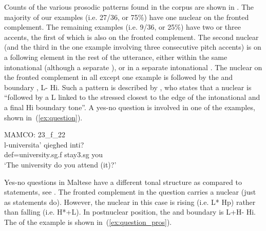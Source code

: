 \documentclass[output=paper]{LSP/langsci}
\begin{document}
Counts of the various prosodic patterns found in the corpus are shown
in . The majority of our examples
(i.e. 27/36, or 75\%) have one nuclear  on the fronted
complement. The remaining examples (i.e. 9/36, or 25\%) have two or
three  accents, the first of which is also on the fronted
complement. The second nuclear  (and the third in the one
example involving three consecutive pitch accents) is on a following
element in the rest of the utterance, either within the same
intonational  (although a separate  ), or in a
separate intonational . The nuclear  on the fronted
complement in all except one example is followed by the 
and boundary , L- Hi.  Such a pattern is described by
\citet[51]{Vella2009}, who states that a nuclear  is
``followed by a L  linked to the stressed 
closest to the edge of the intonational  and a final Hi boundary
tone''.
A yes-no question is involved in one of the examples, shown in~(\ref{ex:question}).

\ea\label{ex:question}
{MAMCO: 23\_f\_22}\\
\gll l-universita’ qiegħed inti? \\
   {\sc def}=university.{\sc sg.f} stay{\sc 3.sg}	you\\
\glt `The university do you attend (it)?'
\z

Yes-no questions in Maltese have a different tonal structure as
compared to statements, see \citet[51]{Vella1995, Vella2009}. The
fronted complement in the question carries a nuclear 
(just as statements do). However, the nuclear  in this
case is rising (i.e. L* Hp) rather than falling (i.e. H*+L). In
postnuclear position, the  and boundary  is
L+H- Hi. The  of the example is shown
in~(\ref{ex:question_pros}).

\end{document}
